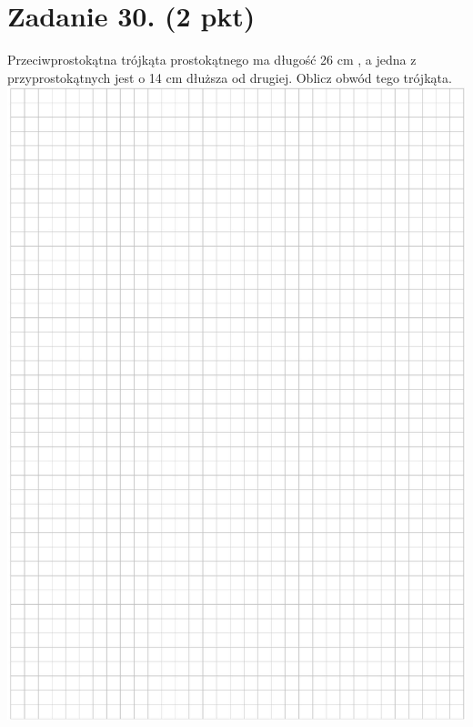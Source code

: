 \documentclass[10pt]{article}
\begin{document}
\section*{Zadanie 30. (2 pkt)}
Przeciwprostokątna trójkąta prostokątnego ma długość 26 cm , a jedna z przyprostokątnych jest o 14 cm dłuższa od drugiej. Oblicz obwód tego trójkąta.\\
\includegraphics[max width=\textwidth, center]{2024_11_21_ad8c43efe74fa059d24eg-20}
\end{document}
